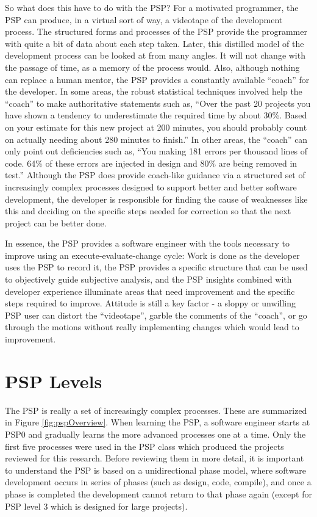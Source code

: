 So what does this have to do with the PSP?  For a motivated programmer, the
PSP can produce, in a virtual sort of way, a videotape of the development
process. The structured forms and processes of the PSP provide the
programmer with quite a bit of data about each step taken.  Later, this
distilled model of the development process can be looked at from many
angles.  It will not change with the passage of time, as a memory of the
process would.  Also, although nothing can replace a human mentor, the
PSP provides a constantly available ``coach'' for the developer.  In some
areas, the robust statistical techniques involved help the ``coach'' to
make authoritative statements such as, ``Over the past 20 projects you have
shown a tendency to underestimate the required time by about 30\%.  Based
on your estimate for this new project at 200 minutes, you should probably
count on actually needing about 280 minutes to finish.''  In other areas,
the ``coach'' can only point out deficiencies such as, ``You making 181
errors per thousand lines of code.  64\% of these errors are injected in
design and 80\% are being removed in test.''  Although the PSP does provide
coach-like guidance via a structured set of increasingly complex processes
designed to support better and better software development, the developer
is responsible for finding the cause of weaknesses like this and deciding
on the specific steps needed for correction so that the next project can be
better done.

In essence, the PSP provides a software engineer with the tools necessary
to improve using an execute-evaluate-change cycle: Work is done as the
developer uses the PSP to record it, the PSP provides a specific structure
that can be used to objectively guide subjective analysis, and the PSP
insights combined with developer experience illuminate areas that need
improvement and the specific steps required to improve.  Attitude is still
a key factor - a sloppy or unwilling PSP user can distort the
``videotape'', garble the comments of the ``coach'', or go through the
motions without really implementing changes which would lead to
improvement.  

\section{PSP Levels}

The PSP is really a set of increasingly complex processes.  These are
summarized in Figure \ref{fig:pspOverview}.  When learning the PSP, a
software engineer starts at PSP0 and gradually learns the more advanced
processes one at a time. Only the first five processes were used in the PSP
class which produced the projects reviewed for this research.  Before
reviewing them in more detail, it is important to understand the PSP is
based on a unidirectional phase model, where software development occurs in
series of phases (such as design, code, compile), and once a phase is
completed the development cannot return to that phase again (except for PSP
level 3 which is designed
for large projects). \\

